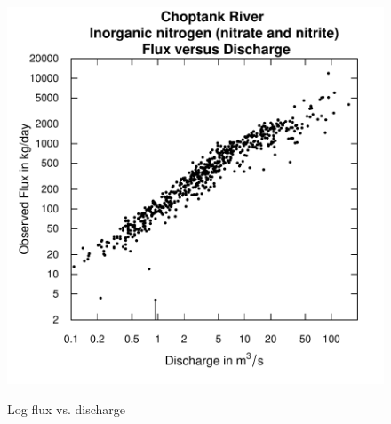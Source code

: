 \documentclass[a4paper,11pt]{article}
\begin{document}
\begin{figure}[htbp]
  \begin{minipage}[h]{0.5\linewidth}
    \begin{center}

\includegraphics{EGRET-figplotLogFluxQ}
    \label{fig:plotLogFluxQ}
    \end{center}
  \end{minipage}
  \hspace{0.5cm}
  
  \caption{Log flux vs. discharge}
  \label{fig:plotLogFluxQMain}
\end{figure}
\end{document}
